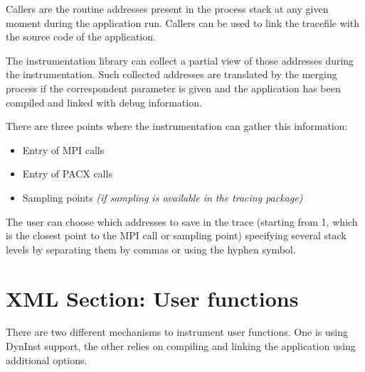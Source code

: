 

Callers are the routine addresses present in the process stack at any given moment during the application run. Callers can be used to link the tracefile with the source code of the application.

The instrumentation library can collect a partial view of those addresses during the instrumentation. Such collected addresses are translated by the merging process if the correspondent parameter is given and the application has been compiled and linked with debug information.

There are three points where the instrumentation can gather this information:

\begin{itemize}
 \item Entry of MPI calls
 \item Entry of PACX calls
 \item Sampling points {\em (if sampling is available in the tracing package)}
\end{itemize}

The user can choose which addresses to save in the trace (starting from 1, which is the closest point to the MPI call or sampling point) specifying several stack levels by separating them by commas or using the hyphen symbol.


\section{XML Section: User functions}\label{sec:XMLSectionUF}



There are two different mechanisms to instrument user functions. One is using DynInst support, the other relies on compiling and linking the application using additional options. 

